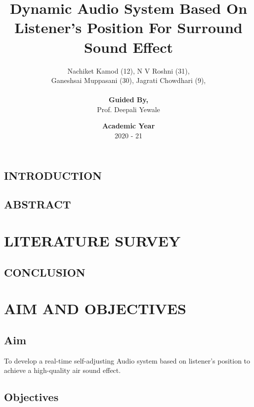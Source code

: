 \documentclass[twocolumn]{report}
\title{\textbf{Dynamic Audio System Based On Listener's Position For Surround Sound Effect}}
\author{Nachiket Kamod (12), N V Roshni (31),\\Ganeshsai Muppasani (30), Jagrati Chowdhari (9), \\\\\textbf{Guided By,}\\Prof. Deepali Yewale}
\date{\textbf{Academic Year}\\2020 - 21}
\begin{document}
\maketitle

\tableofcontents

\listoffigures

\chapter{}

\section{INTRODUCTION}



\section{ABSTRACT}



\chapter{LITERATURE SURVEY}



\section{CONCLUSION}



\chapter{AIM AND OBJECTIVES}

\section{Aim}

To develop a real-time self-adjusting Audio system based on listener's 
position to achieve a high-quality air sound effect.

\section{Objectives}
\end{document}
